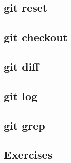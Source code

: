 \subsection{git reset}
\begin{frame}[fragile]
    \subslidetitle
\end{frame}

\subsection{git checkout}
\begin{frame}[fragile]
    \subslidetitle
\end{frame}

\subsection{git diff}
\begin{frame}[fragile]
    \subslidetitle
\end{frame}

\subsection{git log}
\begin{frame}[fragile]
    \subslidetitle
\end{frame}

\subsection{git grep}
\begin{frame}[fragile]
    \subslidetitle
\end{frame}

\subsection{Exercises}
\begin{frame}[fragile]
  \subslidetitle
\end{frame}
